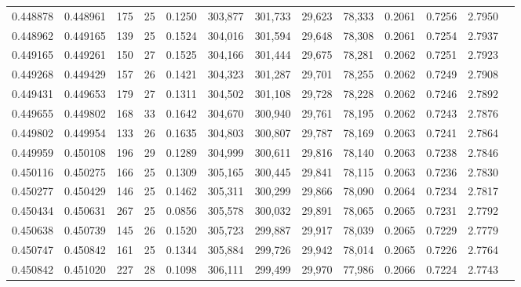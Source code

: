 \begin{tabular}{rrrrrrrrrrrrr}
0.448878 & 0.448961 &   175 &  25 &                                     0.1250 & 303,877 & 301,733 &  29,623 &  78,333 & 0.2061 & 0.7256 & 2.7950 \\
0.448962 & 0.449165 &   139 &  25 &                                     0.1524 & 304,016 & 301,594 &  29,648 &  78,308 & 0.2061 & 0.7254 & 2.7937 \\
0.449165 & 0.449261 &   150 &  27 &                                     0.1525 & 304,166 & 301,444 &  29,675 &  78,281 & 0.2062 & 0.7251 & 2.7923 \\
0.449268 & 0.449429 &   157 &  26 &                                     0.1421 & 304,323 & 301,287 &  29,701 &  78,255 & 0.2062 & 0.7249 & 2.7908 \\
0.449431 & 0.449653 &   179 &  27 &                                     0.1311 & 304,502 & 301,108 &  29,728 &  78,228 & 0.2062 & 0.7246 & 2.7892 \\
0.449655 & 0.449802 &   168 &  33 &                                     0.1642 & 304,670 & 300,940 &  29,761 &  78,195 & 0.2062 & 0.7243 & 2.7876 \\
0.449802 & 0.449954 &   133 &  26 &                                     0.1635 & 304,803 & 300,807 &  29,787 &  78,169 & 0.2063 & 0.7241 & 2.7864 \\
0.449959 & 0.450108 &   196 &  29 &                                     0.1289 & 304,999 & 300,611 &  29,816 &  78,140 & 0.2063 & 0.7238 & 2.7846 \\
0.450116 & 0.450275 &   166 &  25 &                                     0.1309 & 305,165 & 300,445 &  29,841 &  78,115 & 0.2063 & 0.7236 & 2.7830 \\
0.450277 & 0.450429 &   146 &  25 &                                     0.1462 & 305,311 & 300,299 &  29,866 &  78,090 & 0.2064 & 0.7234 & 2.7817 \\
0.450434 & 0.450631 &   267 &  25 &                                     0.0856 & 305,578 & 300,032 &  29,891 &  78,065 & 0.2065 & 0.7231 & 2.7792 \\
0.450638 & 0.450739 &   145 &  26 &                                     0.1520 & 305,723 & 299,887 &  29,917 &  78,039 & 0.2065 & 0.7229 & 2.7779 \\
0.450747 & 0.450842 &   161 &  25 &                                     0.1344 & 305,884 & 299,726 &  29,942 &  78,014 & 0.2065 & 0.7226 & 2.7764 \\
0.450842 & 0.451020 &   227 &  28 &                                     0.1098 & 306,111 & 299,499 &  29,970 &  77,986 & 0.2066 & 0.7224 & 2.7743 \\

\end{tabular}
